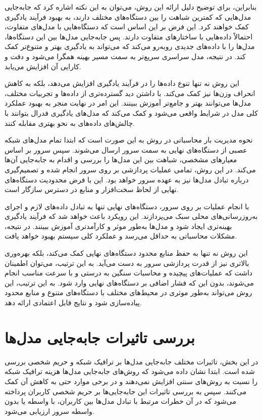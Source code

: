 بنابراین، برای توضیح دلیل ارائه این روش، می‌توان به این نکته اشاره کرد که جابه‌جایی مدل‌هایی که کمترین شباهت را بین دستگاه‌های مختلف دارند، به بهبود فرآیند یادگیری کمک خواهند کرد. این فرض بر این اساس است که دستگاه‌هایی با مدل‌های متفاوت، احتمالاً داده‌هایی با ساختارهای متفاوت دارند. پس جابه‌جایی مدل‌ها بین این دستگاه‌ها، مدل‌ها را با داده‌های جدیدی روبه‌رو می‌کند که می‌تواند به یادگیری بهتر و متنوع‌تر کمک کند. در نتیجه، مدل سراسری سریع‌تر به سمت مسیر بهینه همگرا می‌شود و دقت و کارایی آن افزایش می‌یابد.

این روش نه تنها تنوع داده‌ها را در فرآیند یادگیری افزایش می‌دهد، بلکه به کاهش انحراف وزن‌ها نیز کمک می‌کند. با داشتن دید گسترده‌تری از داده‌ها و تجربیات مختلف، مدل‌ها می‌توانند بهتر و جامع‌تر آموزش ببینند. این امر در نهایت منجر به بهبود عملکرد کلی مدل در شرایط واقعی می‌شود و کمک می‌کند که مدل‌های یادگیری فدرال بتوانند با چالش‌های داده‌های
به نحو بهتری مقابله کنند.


نحوه مدیریت بار محاسباتی در روش
به این صورت است که ابتدا تمام مدل‌های شبکه عصبی از دستگاه‌های نهایی به سمت سرور ارسال می‌شوند. سپس سرور بر اساس معیارهای مشخصی، شباهت بین این مدل‌ها را بررسی و اقدام به جابه‌جایی آن‌ها می‌کند. در این روش، تمامی عملیات پردازشی بر روی سرور انجام شده و تصمیم‌گیری درباره تبادل مدل‌ها نیز به عهده سرور خواهد بود. این با فرض محدودیت دستگاه‌های نهایی از لحاظ سخت‌افزار و منابع در دسترس سازگار است.

با انجام عملیات بر روی سرور، دستگاه‌های نهایی تنها به تبادل داده‌های لازم و اجرای به‌روزرسانی‌های محلی سبک می‌پردازند. این رویکرد باعث خواهد شد که فرآیند یادگیری بهینه‌تری ایجاد شود و مدل‌ها به‌طور موثر و کارآمدتری آموزش ببینند. در نتیجه، مشکلات محاسباتی به حداقل می‌رسد و عملکرد کلی سیستم بهبود خواهد یافت.

این روش نه تنها به حفظ منابع محدود دستگاه‌های نهایی کمک می‌کند، بلکه بهره‌وری بالاتری نیز از قدرت پردازشی سرور به دست می‌آید. به این ترتیب، می‌توان اطمینان داشت که عملیات‌های پیچیده و محاسبات سنگین به درستی و با سرعت مناسب انجام می‌شوند، بدون این که فشار اضافی بر دستگاه‌های نهایی وارد شود. به این ترتیب، این روش می‌تواند به‌طور موثری در محیط‌های مختلف با دستگاه‌های متنوع و منابع محدود پیاده‌سازی شود و نتایج قابل اعتمادی ارائه دهد.


\section{بررسی تاثیرات جابه‌جایی مدل‌ها}
در این بخش، تاثیرات مختلف جابه‌جایی مدل‌ها بر ترافیک شبکه و حریم شخصی بررسی شده است. ابتدا نشان داده می‌شود که روش‌های جابه‌جایی مدل‌ها هزینه ترافیک شبکه را نسبت به روش‌های سنتی افزایش نمی‌دهند و در برخی موارد حتی به کاهش آن کمک می‌کنند. سپس به بررسی تاثیرات این جابه‌جایی‌ها بر حریم شخصی کاربران پرداخته می‌شود که در آن خطرات مرتبط با تبادل مدل‌ها بین کاربران، با واسطه یا بدون واسطه سرور ارزیابی می‌شود.

